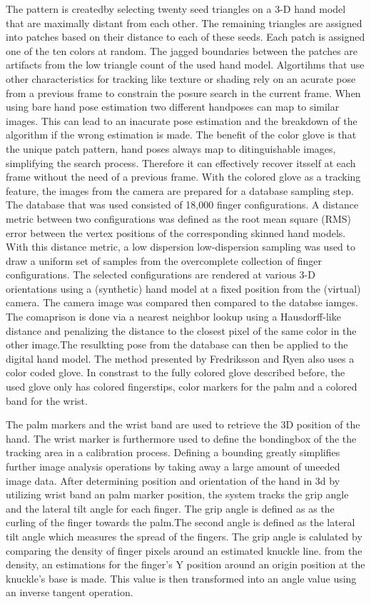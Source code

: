 The pattern is createdby selecting twenty seed triangles on a 3-D hand model that are maximally distant from each other. The remaining triangles are assigned into patches based on their distance to each of these seeds. Each patch is assigned one of the ten colors at random. The jagged boundaries between the patches are artifacts from the low triangle count of the used hand model.
Algortihms that use other characteristics for tracking like texture or shading \cite{LaGorce.2008} rely on an acurate pose from a previous frame to constrain the posure search in the current frame. When using bare hand pose estimation two different handposes can map to similar images. This can lead to an inacurate pose estimation and the breakdown of the algorithm if the wrong estimation is made.
The benefit of the color glove is that the unique patch pattern, hand poses always map to ditinguishable images, simplifying the search process. Therefore it can effectively recover itsself at each frame without the need of a previous frame.
With the colored glove as a tracking feature, the images from the camera are prepared for a database sampling step. The database that was used consisted of 18,000 finger configurations. 
A distance metric between two configurations was defined as the root mean square (RMS) error between the vertex positions of the corresponding skinned hand models. With this distance metric, a low dispersion low-dispersion sampling was used to draw a uniform set of samples from the overcomplete collection of finger configurations.
The selected configurations are rendered at various 3-D orientations using a (synthetic) hand model at a fixed position from the (virtual) camera.
The camera image was compared then compared to the databse iamges. The comaprison is done via a nearest neighbor lookup using a Hausdorff-like distance \cite{Huttenlocher.1993} and penalizing the distance to the closest pixel of the same color in the other image.The resulkting pose from the database can then be applied to the digital hand model.
The method presented by Fredriksson and Ryen \cite{Fredriksson.2008} also uses a color coded glove. In constrast to the fully colored glove described before, the used glove only has colored fingerstips, color markers for the palm and a colored band for the wrist.

The palm markers and the wrist band are used to retrieve the 3D position of the hand. The wrist marker is furthermore used to define the bondingbox of the the tracking area in a calibration process. Defining a bounding greatly simplifies further image analysis operations by taking away a large amount of uneeded image data.
After determining position and orientation of the hand in 3d by utilizing wrist band an palm marker position, the system tracks the grip angle and the lateral tilt angle for each finger. The grip angle is defined as as the curling of the finger towards the palm.The second angle is defined as the lateral tilt angle which measures the spread of the fingers.
The grip angle is calulated by comparing the density of finger pixels around an estimated knuckle line. from the density, an estimations for
the finger’s Y position around an origin position at the knuckle’s base is made. This value is then transformed into an angle value using an inverse tangent operation.

